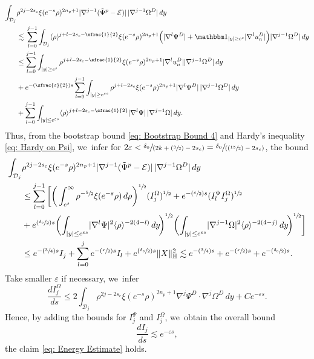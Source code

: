 \documentclass[JEP,XML,SOM,Unicode]{cedram}
\newcommand{\Psfrac}[2]{(\sfrac{#1}{#2})}
\newcommand{\spfrac}[2]{\sfrac{#1}{(#2)}}
\theoremstyle{plain}
\theoremstyle{definition}
\begin{document}
\[
\begin{aligned}
\int_{\mathcal D_j} &\rho^{2j-2s_c}\xi(e^{-s}\rho)^{2n_p+1}|\nabla^{j-1}(\tilde \Psi^p-\mathcal E)|\,|\nabla^{j-1}\Omega^D|\,dy\\
&\lesssim\,\sum_{l=0}^{j-1}\int_{\mathcal D_j} \langle\rho\rangle^{j+l-2s_c-\sfrac{1}{2}}\xi(e^{-s}\rho)^{2n_p+1}\Big(|\nabla^l\Psi^D|+\mathbbm 1_{|y|\ge e^s}|\nabla^l u_n^D|\Big)|\nabla^{j-1}\Omega^D|\,dy\\
&\le  \sum_{l=0}^{j-1}\int_{|y|\ge e^s} \rho^{j+l-2s_c-\sfrac{1}{2}}\xi(e^{-s}\rho)^{2n_p+1}|\nabla^lu_n^D||\nabla^{j-1}\Omega^D|\,dy\\
&+e^{-\Psfrac{\varepsilon}{2} s}\sum_{l=0}^{j-1}\int_{|y|\ge e^{\varepsilon s}} \rho^{j+l-2s_c}\xi(e^{-s}\rho)^{2n_p+1}|\nabla^l \Psi^D |\,|\nabla^{j-1}\Omega^D|\,dy\\
&+\sum_{l=0}^{j-1}\int_{|y|\le e^{\varepsilon s}} \langle\rho\rangle^{j+l-2s_c-\sfrac{1}{2}}|\nabla^l\Psi |\,|\nabla^{j-1}\Omega|\,dy.
\end{aligned}
\]
Thus, from the bootstrap bound \eqref{eq: Bootstrap Bound 4} and Hardy's inequality \eqref{eq: Hardy on Psi}, we~infer for $2\varepsilon<\spfrac{\delta_0}{2k+\Psfrac32-2s_c}=\spfrac{\delta_0}{\Psfrac{15}{2}-2s_c}$, the bound
\[
\begin{aligned}
\int_{\mathcal D_j}& \rho^{2j-2s_c}\xi(e^{-s}\rho)^{2n_p+1}|\nabla^{j-1}(\tilde \Psi^p-\mathcal E)|\,|\nabla^{j-1}\Omega^D|\,dy\\
&\le \sum_{l=0}^{j-1}\bigg[\bigg(\int_{e^s}^\infty \rho^{-\sfrac52}\xi(e^{-s}\rho)\,d\rho\bigg)^{\sfrac{1}{2}}(I_j^\Omega)^{\sfrac12}+e^{-\Psfrac{\varepsilon}{2} s}(I_l^\Psi I_j^\Omega)^{\sfrac{1}{2}}\\
&+e^{\Psfrac{\delta_0}{2} s}\bigg(\!\int_{|y|\le e^{\varepsilon s}}\!|\nabla^l \Psi |^2\langle\rho\rangle^{-2(4-l)}\,dy\!\bigg)^{\sfrac{1}{2}}\bigg(\!\int_{|y|\le e^{\varepsilon s}}\! |\nabla^{j-1}\Omega|^2\langle\rho\rangle^{-2(4-j)}\,dy\!\bigg)^{\sfrac{1}{2}}\bigg]\\
&\le e^{-\Psfrac34 s}I_j+\sum_{l=0}^j e^{-\Psfrac{\varepsilon}{2} s} I_l+e^{\Psfrac{\delta_0}{2}s}\Vert X\Vert_{\mathbb H}^2\lesssim e^{-\Psfrac34 s}+ e^{-\Psfrac{\varepsilon}{2} s}+e^{-\Psfrac{\delta_0}{2}s}.
\end{aligned}
\]
Take smaller $\varepsilon$ if necessary, we~infer
\[
\frac{dI_j^\Omega}{ds}\le 2\int_{\mathcal D_j} \rho^{2j-2s_c}\xi(e^{-s}\rho)^{2n_p+1}\nabla^j\Psi^D\cdot\nabla^j\Omega^D\,dy+C e^{-\varepsilon s}.
\]
Hence, by adding the bounds for $I_j^\Psi$ and $I_j^\Omega$, we~obtain the overall bound
\begin{equation}
\label{eq: Case 1 Energy Estimate}
\frac{dI_j}{ds} \lesssim e^{-\varepsilon s},
\end{equation}
\ie the claim \eqref{eq: Energy Estimate} holds.
\end{document}
